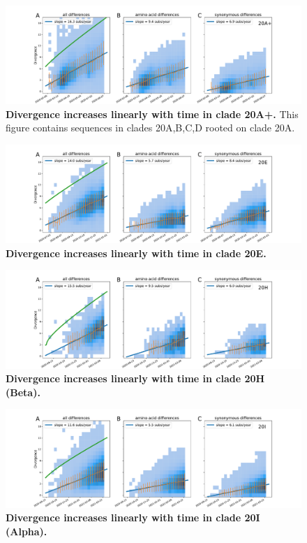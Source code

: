 \begin{figure}[h]
    \includegraphics[width=\textwidth]{figures/rtt/20A+_rtt.pdf}
    \caption{{\bf Divergence increases linearly with time in clade 20A+.}
    This figure contains sequences in clades 20A,B,C,D rooted on clade 20A.
    \label{fig:20A+_divergence}}
\end{figure}



\begin{figure}[h]
    \includegraphics[width=\textwidth]{figures/rtt/20E_rtt.pdf}
    \caption{{\bf Divergence increases linearly with time in clade 20E.}
    \label{fig:20E_divergence}}
\end{figure}

\begin{figure}[h]
    \includegraphics[width=\textwidth]{figures/rtt/20H_rtt.pdf}
    \caption{{\bf Divergence increases linearly with time in clade 20H (Beta).}
    \label{fig:20H_divergence}}
\end{figure}

\begin{figure}[h]
    \includegraphics[width=\textwidth]{figures/rtt/20I_rtt.pdf}
    \caption{{\bf Divergence increases linearly with time in clade 20I (Alpha).}
    \label{fig:20I_divergence}}
\end{figure}

